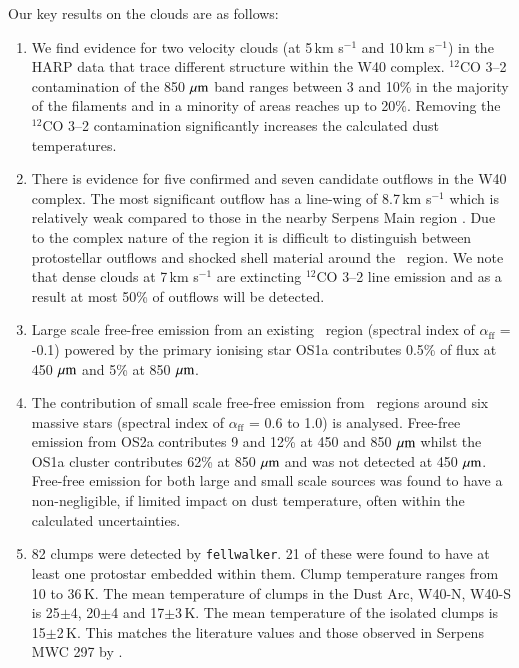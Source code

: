 Our key results on the clouds are as follows:

\begin{enumerate}
\item We find evidence for two velocity clouds (at 5\,km s$^{-1}$ and 10\,km s$^{-1}$) in the 
HARP data that trace different structure within the W40 complex. $^{12}$CO 3\hbox{--}2 
contamination of the 850\,$\,\mu\rm{m}$ band ranges between 3 and 10\% in the majority of the 
filaments and in a minority of areas reaches up to 20\%. Removing the $^{12}$CO 3\hbox{--}2 
contamination significantly increases the calculated dust temperatures.

\item There is evidence for five confirmed and seven candidate outflows in the W40 
complex. The most significant outflow has a line-wing of 8.7\,km s$^{-1}$ which is relatively 
weak compared to those in the nearby Serpens Main region \citep{Graves:2010mb}. 
Due to the complex nature of the region it is difficult to distinguish between protostellar 
outflows and shocked shell material around the \HII\ region. We note that dense clouds at 
7\,km s$^{-1}$ are extincting $^{12}$CO 3\hbox{--}2 line emission and as a result at most 
50\% of outflows will be detected. 

\item Large scale free-free emission from an existing \HII\ region (spectral index of 
$\alpha_{\mathrm{ff}}$ = -0.1) powered by the primary ionising star OS1a contributes 
0.5\% of flux at 450\,$\,\mu\rm{m}$ and 5\% at 850\,$\,\mu\rm{m}$. 

\item The contribution of small scale free-free emission from \UCHII\ regions around six 
massive stars (spectral index of $\alpha_{\mathrm{ff}}$ = 0.6 to 1.0) is analysed. Free-free 
emission from OS2a contributes 9 and 12\% at 450 and 850\,$\,\mu\rm{m}$ whilst the OS1a 
cluster contributes 62\% at 850\,$\,\mu\rm{m}$ and was not detected at 450\,$\,\mu\rm{m}$. Free-free 
emission for both large and small scale sources was found to have a non-negligible, if limited 
impact on dust temperature, often within the calculated uncertainties. 

\item 82 clumps were detected by \texttt{fellwalker}. 21 of these were found to have at least one 
protostar embedded within them. Clump temperature ranges from 10 to 36\,K. The mean temperature 
of clumps in the Dust Arc, W40-N, W40-S is 25$\pm$4, 20$\pm$4 and 17$\pm$3\,K. The mean 
temperature of the isolated clumps is 15$\pm$2\,K. This matches the literature values \citep {Johnstone:2000fk} 
and those observed in Serpens MWC 297 by \cite{Rumble:2015vn}.


\end{enumerate}
